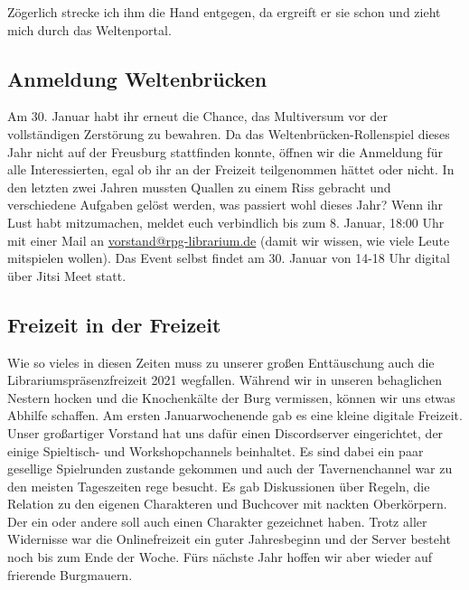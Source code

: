\documentclass[final]{multiversum}
\begin{document}
Zögerlich strecke ich ihm die Hand entgegen, da ergreift er sie schon und zieht mich durch das Weltenportal.
\vfill

\subsection{Anmeldung Weltenbrücken}
Am 30. Januar habt ihr erneut die Chance, das Multiversum vor der vollständigen Zerstörung zu bewahren. 
Da das Weltenbrücken-Rollenspiel dieses Jahr nicht auf der Freusburg stattfinden konnte, öffnen wir die Anmeldung für alle Interessierten, egal ob ihr an der Freizeit teilgenommen hättet oder nicht. 
In den letzten zwei Jahren mussten Quallen zu einem Riss gebracht und verschiedene Aufgaben gelöst werden, was passiert wohl dieses Jahr?
Wenn ihr Lust habt mitzumachen, meldet euch verbindlich bis zum 8. Januar, 18:00 Uhr mit einer Mail an \href{mailto:vorstand@rpg-librarium.de}{vorstand@rpg-librarium.de} (damit wir wissen, wie viele Leute mitspielen wollen).
Das Event selbst findet am 30. Januar von 14-18 Uhr digital über Jitsi Meet statt.

\subsection{Freizeit in der Freizeit}
Wie so vieles in diesen Zeiten muss zu unserer großen Enttäuschung auch die Librariumspräsenzfreizeit 2021 wegfallen.
Während wir in unseren behaglichen Nestern hocken und die Knochenkälte der Burg vermissen, können wir uns etwas Abhilfe schaffen.
Am ersten Januarwochenende gab es eine kleine digitale Freizeit.
Unser großartiger Vorstand hat uns dafür einen Discordserver eingerichtet, der einige Spieltisch- und Workshopchannels beinhaltet.
Es sind dabei ein paar gesellige Spielrunden zustande gekommen und auch der Tavernenchannel war zu den meisten Tageszeiten rege besucht.
Es gab Diskussionen über Regeln, die Relation zu den eigenen Charakteren und Buchcover mit nackten Oberkörpern.
Der ein oder andere soll auch einen Charakter gezeichnet haben.
Trotz aller Widernisse war die Onlinefreizeit ein guter Jahresbeginn und der Server besteht noch bis zum Ende der Woche.
Fürs nächste Jahr hoffen wir aber wieder auf frierende Burgmauern.
\end{document}
